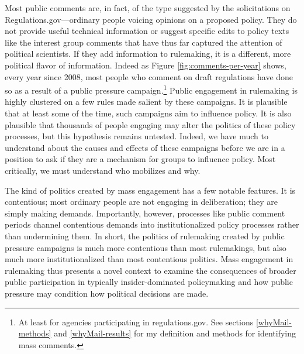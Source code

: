 \documentclass[
      12pt,
        ]{article}
\begin{document}
Most public comments are, in fact, of the type suggested by the
solicitations on Regulations.gov---ordinary people voicing opinions on a proposed policy. They do not provide useful technical information or
suggest specific edits to policy texts like the interest group comments
that have thus far captured the attention of political scientists. If
they add information to rulemaking, it is a different, more political
flavor of information. Indeed as Figure
\ref{fig:comments-per-year} shows, every year since 2008, most people who
comment on draft regulations have done so as a result of a public pressure campaign.\footnote{At least for agencies participating in regulations.gov. See
  sections
  \ref{whyMail-methods} and
  \ref{whyMail-results} for my definition and methods for identifying mass comments.} Public engagement in rulemaking is highly
clustered on a few rules made salient by these campaigns. It is
plausible that at least some of the time, such campaigns aim to
influence policy. It is also plausible that thousands of people engaging
may alter the politics of these policy processes, but this hypothesis
remains untested. Indeed, we have much to understand about the causes
and effects of these campaigns before we are in a position to ask if
they are a mechanism for groups to influence policy. Most critically, we
must understand who mobilizes and why.

The kind of politics created by mass engagement has a few notable
features. It is contentious; most ordinary people are not engaging in
deliberation; they are simply making demands. Importantly, however,
processes like public comment periods channel contentious demands into
institutionalized policy processes rather than undermining them. In
short, the politics of rulemaking created by public pressure campaigns is much
more contentious than most rulemakings, but also much more
institutionalized than most contentious politics. Mass engagement in
rulemaking thus presents a novel context to examine the consequences of
broader public participation in typically insider-dominated policymaking and how
public pressure may condition how political decisions are made.
\end{document}
